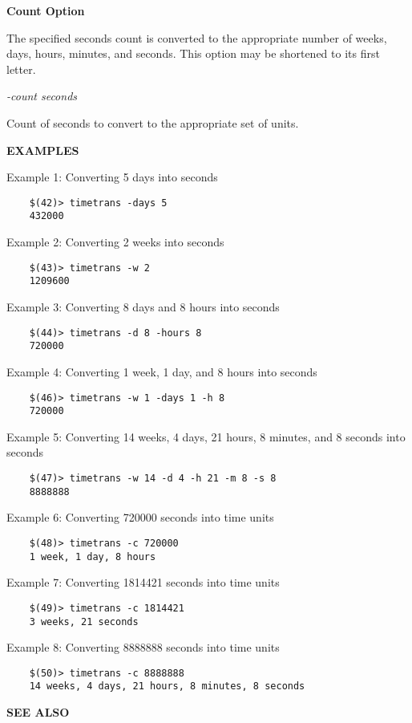 {\bf Count Option}

The specified seconds count is converted to the appropriate number of weeks,
days, hours, minutes, and seconds.  This option may be shortened to its first
letter.

\begin{description}

\item {\it -count seconds}\verb" "

Count of seconds to convert to the appropriate set of units.

\end{description}

{\bf EXAMPLES}

Example 1:  Converting 5 days into seconds

\begin{verbatim}
    $(42)> timetrans -days 5
    432000
\end{verbatim}

Example 2:  Converting 2 weeks into seconds

\begin{verbatim}
    $(43)> timetrans -w 2
    1209600
\end{verbatim}

Example 3:  Converting 8 days and 8 hours into seconds

\begin{verbatim}
    $(44)> timetrans -d 8 -hours 8
    720000
\end{verbatim}

Example 4:  Converting 1 week, 1 day, and 8 hours into seconds

\begin{verbatim}
    $(46)> timetrans -w 1 -days 1 -h 8
    720000
\end{verbatim}

Example 5:  Converting 14 weeks, 4 days, 21 hours, 8 minutes, and 8 seconds into seconds

\begin{verbatim}
    $(47)> timetrans -w 14 -d 4 -h 21 -m 8 -s 8
    8888888
\end{verbatim}

Example 6:  Converting 720000 seconds into time units

\begin{verbatim}
    $(48)> timetrans -c 720000
    1 week, 1 day, 8 hours
\end{verbatim}

Example 7:  Converting 1814421 seconds into time units

\begin{verbatim}
    $(49)> timetrans -c 1814421
    3 weeks, 21 seconds
\end{verbatim}

Example 8:  Converting 8888888 seconds into time units

\begin{verbatim}
    $(50)> timetrans -c 8888888
    14 weeks, 4 days, 21 hours, 8 minutes, 8 seconds
\end{verbatim}


{\bf SEE ALSO}


